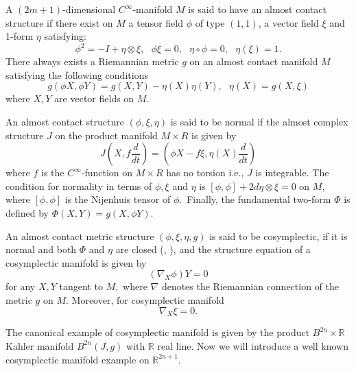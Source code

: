 \documentclass{amsart}
\theoremstyle{plain}
\numberwithin{equation}{section}
\begin{document}
A $(2m+1)$-dimensional $C^{\infty }$-manifold $M$ is said to have an almost
contact structure if there exist on $M$ a tensor field $\phi $ of type $(1,1) $, a vector field $\xi $ and 1-form $\eta $ satisfying:\begin{equation}
\phi ^{2}=-I+\eta \otimes \xi ,\text{ \ }\phi \xi =0,\text{ }\eta \circ \phi
=0,\text{ \ \ }\eta (\xi )=1.  \label{fi}
\end{equation}There always exists a Riemannian metric $g$ on an almost contact manifold $M$
satisfying the following conditions\begin{equation}
g(\phi X,\phi Y)=g(X,Y)-\eta (X)\eta (Y),\text{\ }\eta (X)=g(X,\xi )
\label{metric}
\end{equation}where $X,Y$ are vector fields on $M.$

An almost contact structure $(\phi ,\xi ,\eta )$ is said to be normal if the
almost complex structure $J$ on the product manifold $M\times R$ is given by\begin{equation*}
J(X,f\frac{d}{dt})=(\phi X-f\xi ,\eta (X)\frac{d}{dt})
\end{equation*}where $f$ is the $C^{\infty }$-function on $M\times R$ has no torsion i.e., $J$ is integrable. The condition for normality in terms of $\phi ,\xi $ and $\eta $ is $\left[ \phi ,\phi \right] +2d\eta \otimes \xi =0$ on $M$, where $\left[ \phi ,\phi \right] $ is the Nijenhuis tensor of $\phi .$~Finally, the
fundamental two-form $\Phi $ is defined by $\Phi (X,Y)=g(X,\phi Y).$

An almost contact metric structure $(\phi ,\xi ,\eta ,g)$ is said to be
cosymplectic, if it is normal and both $\Phi $ and $\eta $ are closed (\cite{BL1}, \cite{LUDDEN}), and the structure equation of a cosymplectic manifold
is given by\begin{equation}
(\nabla _{X}\phi )Y=0  \label{nambla}
\end{equation}for any $X,Y$ tangent to $M,$ where $\nabla $ denotes the Riemannian
connection of the metric $g$ on $M.$ Moreover, for cosymplectic manifold\begin{equation}
\nabla _{X}\xi =0.  \label{xzeta}
\end{equation}

The canonical example of cosymplectic manifold is given by the product $B^{2n}\times 
\mathbb{R}
$ Kahler manifold $B^{2n}(J,g)$ with $\mathbb{R}
$ real line. Now we will introduce a well known cosymplectic manifold
example on $\mathbb{R}
^{2n+1}.$
\end{document}
